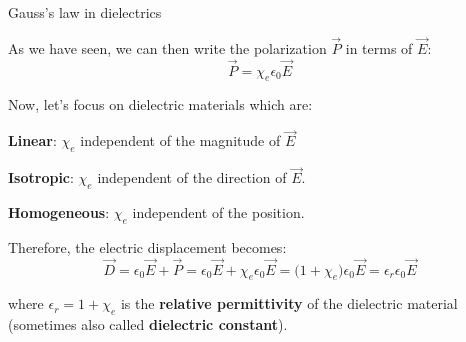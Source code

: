 \begin{frame}{Gauss's law in dielectrics}

As we have seen, we can then write the
polarization $\vec{P}$ in terms of $\vec{E}$:
\begin{equation*}
  \vec{P} = \chi_{e} \epsilon_0 \vec{E}
\end{equation*}

\vspace{0.3cm}

Now, let's focus on dielectric materials which are:
\begin{itemize}
{\small
  \item {\bf Linear}: $\chi_{e}$ independent of the magnitude of $\vec{E}$
  \item {\bf Isotropic}: $\chi_{e}$ independent of the direction of $\vec{E}$.
  \item {\bf Homogeneous}: $\chi_{e}$ independent of the position.
}
\end{itemize}

Therefore, the electric displacement becomes:
\begin{equation*}
   \vec{D} = \epsilon_0 \vec{E} + \vec{P}
           = \epsilon_0 \vec{E} + \chi_{e} \epsilon_0 \vec{E}
           = \Big( 1 + \chi_{e} \Big) \epsilon_0 \vec{E}
           = \epsilon_{r} \epsilon_0 \vec{E}
\end{equation*}

where $\epsilon_{r} = 1 + \chi_{e}$ is the {\bf relative permittivity} of the dielectric material
(sometimes also called {\bf dielectric constant}).

\end{frame}


%
%
%

